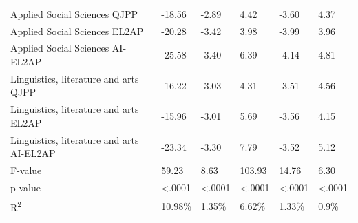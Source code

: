 \begin{longtable}[c]{p{5.5cm}p{1.25cm}p{1.25cm}p{1.25cm}p{1.25cm}p{1.25cm}}
Applied Social Sciences QJPP & -18.56 & -2.89 & 4.42 & -3.60 & 4.37 \\
Applied Social Sciences EL2AP & -20.28 & -3.42 & 3.98 & -3.99 & 3.96 \\
Applied Social Sciences AI-EL2AP & -25.58 & -3.40 & 6.39 & -4.14 & 4.81 \\
Linguistics, literature and arts QJPP & -16.22 & -3.03 & 4.31 & -3.51 & 4.56 \\
Linguistics, literature and arts EL2AP & -15.96 & -3.01 & 5.69 & -3.56 & 4.15 \\
Linguistics, literature and arts AI-EL2AP & -23.34 & -3.30 & 7.79 & -3.52 & 5.12 \\
\hline
F-value & 59.23 & 8.63 & 103.93 & 14.76 & 6.30 \\
p-value & <.0001 & <.0001 & <.0001 & <.0001 & <.0001 \\
R\textsuperscript{2} & 10.98\% & 1.35\% & 6.62\% & 1.33\% & 0.9\% \\
\end{longtable}
